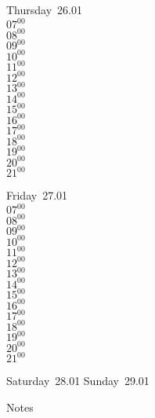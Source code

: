 \documentclass[11pt,a4paper]{book}\usepackage[]{graphicx}\usepackage[]{color}
\begin{document}
\clearpage
\begin{headerbox}
\end{headerbox}
\begin{weekdaybox}
  Thursday~26.01\\
  { 
  \vfill
  $07^{00}$\\
$08^{00}$\\
$09^{00}$\\
$10^{00}$\\
$11^{00}$\\
$12^{00}$\\
$13^{00}$\\
$14^{00}$\\
$15^{00}$\\
$16^{00}$\\
$17^{00}$\\
$18^{00}$\\
$19^{00}$\\
$20^{00}$\\
$21^{00}$\\
  }
\end{weekdaybox} 
\begin{weekdaybox}
  Friday~27.01\\
  { 
  \vfill
  $07^{00}$\\
$08^{00}$\\
$09^{00}$\\
$10^{00}$\\
$11^{00}$\\
$12^{00}$\\
$13^{00}$\\
$14^{00}$\\
$15^{00}$\\
$16^{00}$\\
$17^{00}$\\
$18^{00}$\\
$19^{00}$\\
$20^{00}$\\
$21^{00}$\\
  }
\end{weekdaybox}
\begin{weekendbox}
  Saturday~28.01
  \tcblower
  Sunday~29.01
\end{weekendbox} %
\begin{notebox}
  Notes
\end{notebox}
\clearpage
\end{document}

